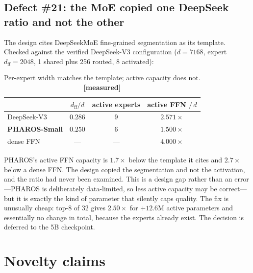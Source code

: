 \documentclass[11pt,a4paper]{article}
\newcommand{\meas}{\textcolor{measured}{\textbf{[measured]}}}
\begin{document}
\subsection{Defect \#21: the MoE copied one DeepSeek ratio and not the other}

The design cites DeepSeekMoE fine-grained segmentation as its template. Checked
against the verified DeepSeek-V3 configuration ($d=7168$, expert
$d_{\text{ff}}=2048$, 1 shared plus 256 routed, 8 activated):

\begin{table}[h]
\centering
\caption{Per-expert width matches the template; active capacity does not. \meas}
\begin{tabular}{lccc}
\toprule
 & \textbf{$d_{\text{ff}}/d$} & \textbf{active experts} & \textbf{active FFN $/\,d$} \\
\midrule
DeepSeek-V3 & $0.286$ & 9 & $\mathbf{2.571\times}$ \\
\textbf{PHAROS-Small} & $0.250$ & 6 & $\mathbf{1.500\times}$ \\
dense FFN & --- & --- & $4.000\times$ \\
\bottomrule
\end{tabular}
\end{table}

PHAROS's active FFN capacity is $1.7\times$ below the template it cites and
$2.7\times$ below a dense FFN. The design copied the segmentation and not the
activation, and the ratio had never been examined. This is a design gap rather
than an error---PHAROS is deliberately data-limited, so less active capacity may
be correct---but it is exactly the kind of parameter that silently caps quality.
The fix is unusually cheap: top-8 of 32 gives $2.50\times$ for $+12.6$M active
parameters and essentially no change in total, because the experts already
exist. The decision is deferred to the 5B checkpoint.

\section{Novelty claims}
\end{document}
